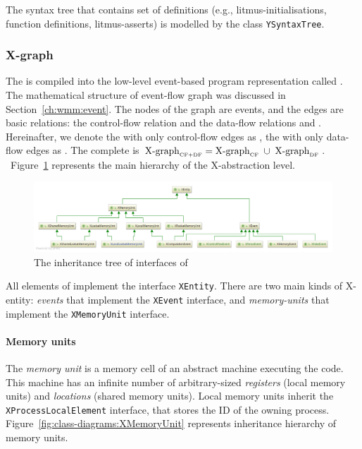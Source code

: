 The syntax tree that contains set of definitions (e.g., litmus-initialisations, function definitions, litmus-asserts) is modelled by the class \texttt{YSyntaxTree}.


\subsubsection{X-graph}
\label{ch:impl:model:xgraph}

The \ytree{} is compiled into the low-level event-based program representation called \textit{\xgraph{}}.
The mathematical structure of event-flow graph was discussed in Section~\ref{ch:wmm:event}.
The nodes of the graph are events, and the edges are basic relations: the control-flow relation \po and the data-flow relations \co and \rf.
Hereinafter, we denote the \xgraph{} with only control-flow edges as \xgraph[CF], the \xgraph{} with only data-flow edges as \xgraph[CF]. The complete \xgraph{} is $\xgraph[CF+DF] = \xgraph[CF] \; \cup \; \xgraph[DF]$.
\ Figure~\ref{fig:class-diagrams:XEntity-interfaces} represents the main hierarchy of the X-abstraction level.

\begin{figure}[t]%
  \centering
  \includegraphics[width=\textwidth,keepaspectratio]{img/my/class-diagrams/XEntity-interfaces.png}
  \caption{The inheritance tree of interfaces of \xgraph{}}
  \label{fig:class-diagrams:XEntity-interfaces}
\end{figure}

All elements of \xgraph{} implement the interface \texttt{XEntity}.
There are two main kinds of X-entity: \textit{events} that implement the \texttt{XEvent} interface, and \textit{memory-units} that implement the \texttt{XMemoryUnit} interface.


\paragraph{Memory units}
\label{ch:impl:model:xgraph:mem}

The \textit{memory unit} is a memory cell of an abstract machine executing the code.
This machine has an infinite number of arbitrary-sized \textit{registers} (local memory units) and \textit{locations} (shared memory units).
Local memory units inherit the \texttt{XProcessLocalElement} interface, that stores the ID of the owning process.
Figure~\ref{fig:class-diagrams:XMemoryUnit} represents inheritance hierarchy of memory units.

